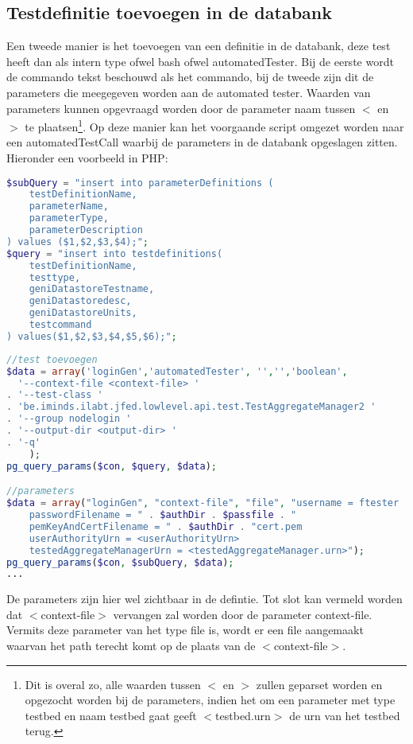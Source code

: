 \subsection{Testdefinitie toevoegen in de databank}
\npar
Een tweede manier is het toevoegen van een definitie in de databank, deze test heeft dan als intern type ofwel bash ofwel automatedTester. Bij de eerste wordt de commando tekst beschouwd als het commando, bij de tweede zijn dit de parameters die meegegeven worden aan de automated tester. Waarden van parameters kunnen opgevraagd worden door de parameter naam tussen $<$ en $>$ te plaatsen\footnote{Dit is overal zo, alle waarden tussen $<$ en $>$ zullen geparset worden en opgezocht worden bij de parameters, indien het om een parameter met type testbed en naam testbed gaat geeft $<$testbed.urn$>$ de urn van het testbed terug.}.
\npar 
Op deze manier kan het voorgaande script omgezet worden naar een automatedTestCall waarbij de parameters in de databank opgeslagen zitten. Hieronder een voorbeeld in PHP:
\begin{lstlisting}[language=PHP]
$subQuery = "insert into parameterDefinitions (
	testDefinitionName,
	parameterName,
	parameterType,
	parameterDescription
) values ($1,$2,$3,$4);";
$query = "insert into testdefinitions(
	testDefinitionName,
	testtype,
	geniDatastoreTestname,
	geniDatastoredesc,
	geniDatastoreUnits,
	testcommand
) values($1,$2,$3,$4,$5,$6);";
\end{lstlisting}
\clearpage
\begin{lstlisting}[language=PHP]
//test toevoegen
$data = array('loginGen','automatedTester', '','','boolean', 
  '--context-file <context-file> '
. '--test-class '
. 'be.iminds.ilabt.jfed.lowlevel.api.test.TestAggregateManager2 '
. '--group nodelogin '
. '--output-dir <output-dir> '
. '-q'
    ); 
pg_query_params($con, $query, $data);

//parameters
$data = array("loginGen", "context-file", "file", "username = ftester
    passwordFilename = " . $authDir . $passfile . "
    pemKeyAndCertFilename = " . $authDir . "cert.pem
    userAuthorityUrn = <userAuthorityUrn>
    testedAggregateManagerUrn = <testedAggregateManager.urn>");
pg_query_params($con, $subQuery, $data);
...
\end{lstlisting}
\npar
De parameters zijn hier wel zichtbaar in de defintie. Tot slot kan vermeld worden dat $<$context-file$>$ vervangen zal worden door de parameter context-file. Vermits deze parameter van het type file is, wordt er een file aangemaakt waarvan het path terecht komt op de plaats van de $<$context-file$>$. 

